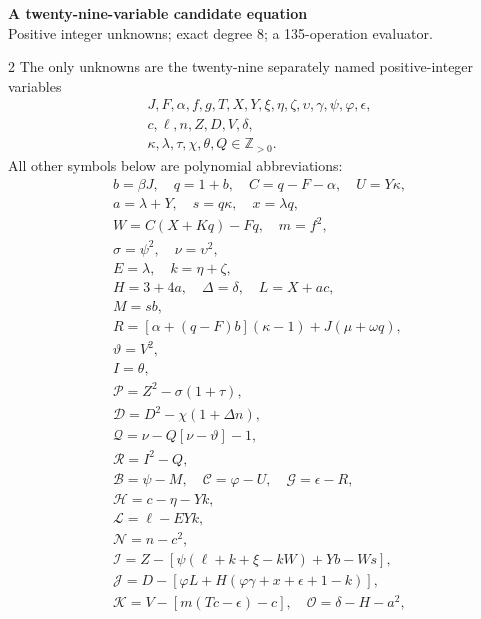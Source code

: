 \documentclass[10pt]{article}
\begin{document}
\begin{center}
{\large\bfseries A twenty-nine-variable candidate equation}\\[-1pt]
{\small Positive integer unknowns; exact degree 8; a 135-operation evaluator.}
\end{center}\vspace{-8pt}
\begin{multicols}{2}
\fontsize{8.6}{9.1}\selectfont
The only unknowns are the twenty-nine separately named positive-integer variables
\[
\begin{gathered}J,F,\alpha,f,g,T,X,Y,\xi,\eta,\zeta,\upsilon,\gamma,\psi,\varphi,\epsilon,\\
c,\ell,n,Z,D,V,\delta,\\
\kappa,\lambda,\tau,\chi,\theta,Q\in\mathbb Z_{>0}.\end{gathered}
\]
All other symbols below are polynomial abbreviations:
\[
\begin{gathered}
b=\beta J,\quad q=1+b,\quad C=q-F-\alpha,\quad U=Y\kappa,\\
a=\lambda+Y,\quad s=q\kappa,\quad x=\lambda q,\\
W=C(X+Kq)-Fq,\quad m=f^2,\\
\sigma=\psi^2,\quad\nu=\upsilon^2,\\
E=\lambda,\quad k=\eta+\zeta,\\
H=3+4a,\quad\Delta=\delta,\quad L=X+ac,\\
M=sb,\\
R=[\alpha+(q-F)b](\kappa-1)+J(\mu+\omega q),\\
\vartheta=V^2,\\
I=\theta,\\
\mathcal{P}=Z^2-\sigma(1+\tau),\\
\mathcal{D}=D^2-\chi(1+\Delta n),\\
\mathcal{Q}=\nu-Q[\nu-\vartheta]-1,\\
\mathcal{R}=I^2-Q,\\
\mathcal{B}=\psi-M,\quad \mathcal{C}=\varphi-U,\quad \mathcal{G}=\epsilon-R,\\
\mathcal{H}=c-\eta-Yk,\\
\mathcal{L}=\ell-EYk,\\
\mathcal{N}=n-c^2,\\
\mathcal{I}=Z-[\psi(\ell+k+\xi-kW)+Yb-Ws],\\
\mathcal{J}=D-[\varphi L+H(\varphi\gamma+x+\epsilon+1-k)],\\
\mathcal{K}=V-[m(Tc-\epsilon)-c],\quad\mathcal{O}=\delta-H-a^2,\\

\end{gathered}\]
\end{multicols}
\end{document}
